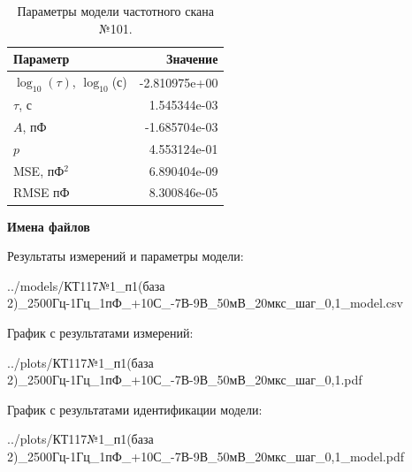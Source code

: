 \begin{table}[!ht]
    \centering
    \caption{Параметры модели частотного скана №101.}
    \begin{tabular}{|l|r|}
        \hline
        Параметр                                       & Значение                  \\ \hline
        $\log_{10}(\tau)$, $\log_{10}$(с)              & -2.810975e+00             \\ \hline
        $\tau$, с                                      & 1.545344e-03              \\ \hline
        $A$, пФ                                        & -1.685704e-03             \\ \hline
        $p$                                            & 4.553124e-01              \\ \hline
        MSE, пФ$^2$                                    & 6.890404e-09              \\ \hline
        RMSE пФ                                        & 8.300846e-05              \\ \hline
    \end{tabular}
    \label{table:frequency_scan_model_101}
\end{table}

\textbf{Имена файлов}

Результаты измерений и параметры модели:

\scriptsize../models/КТ117№1\_п1(база 2)\_2500Гц-1Гц\_1пФ\_+10С\_-7В-9В\_50мВ\_20мкс\_шаг\_0,1\_model.csv
\normalsize

График с результатами измерений:

\scriptsize../plots/КТ117№1\_п1(база 2)\_2500Гц-1Гц\_1пФ\_+10С\_-7В-9В\_50мВ\_20мкс\_шаг\_0,1.pdf
\normalsize

График с результатами идентификации модели:

\scriptsize../plots/КТ117№1\_п1(база 2)\_2500Гц-1Гц\_1пФ\_+10С\_-7В-9В\_50мВ\_20мкс\_шаг\_0,1\_model.pdf
\normalsize

